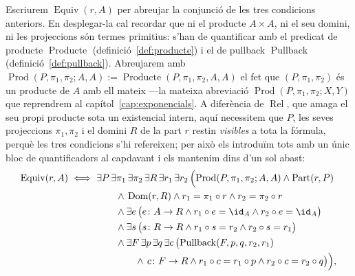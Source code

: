 \begin{notacio}\label{not:equiv-predicat}
Escriurem \(\operatorname{Equiv}(r,A)\) per abreujar la conjunció de les tres condicions anteriors. En desplegar-la cal recordar que ni el producte \(A\times A\), ni el seu domini, ni les projeccions són termes primitius: s'han de quantificar amb el predicat de producte \(\operatorname{Producte}\) (definició~\ref{def:producte}) i el de pullback \(\operatorname{Pullback}\) (definició~\ref{def:pullback}). Abreujarem amb \(\operatorname{Prod}(P,\pi_1,\pi_2;A,A):=\operatorname{Producte}(P,\pi_1,\pi_2,A,A)\) el fet que \((P,\pi_1,\pi_2)\) és un producte de \(A\) amb ell mateix ---la mateixa abreviació \(\operatorname{Prod}(P,\pi_1,\pi_2;X,Y)\) que reprendrem al capítol~\ref{cap:exponencials}. A diferència de \(\operatorname{Rel}\), que amaga el seu propi producte sota un existencial intern, aquí necessitem que \(P\), les seves projeccions \(\pi_1,\pi_2\) i el domini \(R\) de la part \(r\) restin \emph{visibles} a tota la fórmula, perquè les tres condicions s'hi refereixen; per això els introduïm tots amb un únic bloc de quantificadors al capdavant i els mantenim dins d'un sol abast:
\[
\begin{aligned}
\operatorname{Equiv}(r,A)
\iff{}&
\exists P\,\exists\pi_1\,\exists\pi_2\,\exists R\,\exists r_1\,\exists r_2\,\Bigl(
\operatorname{Prod}(P,\pi_1,\pi_2;A,A)\land\operatorname{Part}(r,P)
\\
&\qquad{}\land\,\Dom(r,R)\land r_1=\pi_1\circ r\land r_2=\pi_2\circ r
\\
&\qquad{}\land\exists e\,\bigl(e\colon A\to R\land r_1\circ e=\id_A\land r_2\circ e=\id_A\bigr)
\\
&\qquad{}\land\exists s\,\bigl(s\colon R\to R\land r_1\circ s=r_2\land r_2\circ s=r_1\bigr)
\\
&\qquad{}\land\exists F\,\exists p\,\exists q\,\exists c\,\bigl(
\operatorname{Pullback}(F,p,q,r_2,r_1)
\\
&\qquad\qquad{}\land\,c\colon F\to R
\land r_1\circ c=r_1\circ p\land r_2\circ c=r_2\circ q
\bigr)
\Bigr),
\end{aligned}
\]

\end{notacio}
